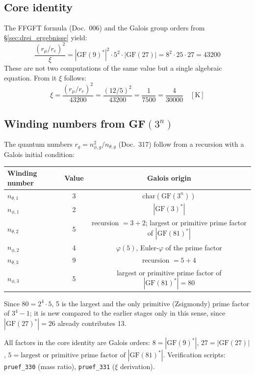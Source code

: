 \subsection{Core identity}

The FFGFT formula (Doc.~006) and the Galois group orders
from §\ref{sec:drei_ergebnisse} yield:
\begin{equation}
  \frac{(r_\mu/r_e)^2}{\xi}
  = |\text{GF}(9)^*|^2 \cdot 5^2 \cdot |\text{GF}(27)|
  = 8^2 \cdot 25 \cdot 27
  = 43200
\end{equation}
These are not two computations of the same value but a single
algebraic equation. From it $\xi$ follows:
\begin{equation}
  \xi = \frac{(r_\mu/r_e)^2}{43200}
  = \frac{(12/5)^2}{43200}
  = \frac{1}{7500} = \frac{4}{30000}
  \quad [\text{K}]
\end{equation}

\subsection{Winding numbers from GF$(3^n)$}

The quantum numbers $r_g = n_{\phi,g}^2/n_{\theta,g}$ (Doc.~317) follow
from a recursion with a Galois initial condition:

\begin{center}
\begin{tabular}{lcc}
\toprule
Winding number & Value & Galois origin \\
\midrule
$n_{\theta,1}$ & 3 & $\text{char}(\text{GF}(3^n))$ \\
$n_{\phi,1}$   & 2 & $|\text{GF}(3)^*|$ \\
$n_{\theta,2}$ & 5 & recursion $= 3+2$; largest or primitive prime factor of $|\text{GF}(81)^*|$ \\
$n_{\phi,2}$   & 4 & $\varphi(5)$, Euler-$\varphi$ of the prime factor \\
$n_{\theta,3}$ & 9 & recursion $= 5+4$ \\
$n_{\phi,3}$   & 5 & largest or primitive prime factor of $|\text{GF}(81)^*| = 80$ \\
\bottomrule
\end{tabular}
\end{center}
Since $80 = 2^4\cdot 5$, 5 is the largest and the only primitive (Zsigmondy)
prime factor of $3^4-1$; it is new compared to the earlier stages only in this
sense, since $|\text{GF}(27)^*| = 26$ already contributes 13.

All factors in the core identity are Galois orders:
$8 = |\text{GF}(9)^*|$, $27 = |\text{GF}(27)|$,
$5 = \text{largest or primitive prime factor of } |\text{GF}(81)^*|$.
Verification scripts: \texttt{pruef\_330} (mass ratio),
\texttt{pruef\_331} ($\xi$ derivation).

